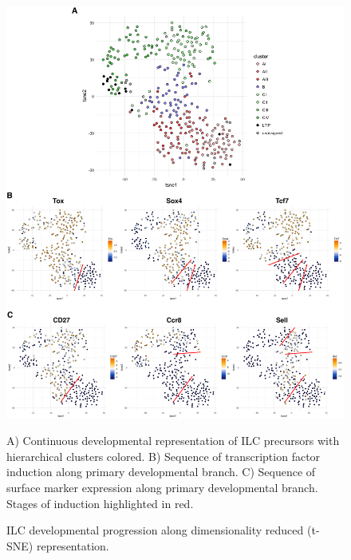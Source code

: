 \begin{subappendices}
\begin{figure}[p]
	\includegraphics[width=\textwidth]{figures/appendix/Appendix_2_clustering_timing}
	\caption{ILC developmental progression along dimensionality reduced (t-SNE) representation.} 
	A) Continuous developmental representation of ILC precursors with hierarchical clusters colored. B) Sequence of transcription factor induction along primary developmental branch. C) Sequence of surface marker expression along primary developmental branch. Stages of induction highlighted in red. 
	\label{fig:app_clust}
\end{figure}


\end{subappendices}
